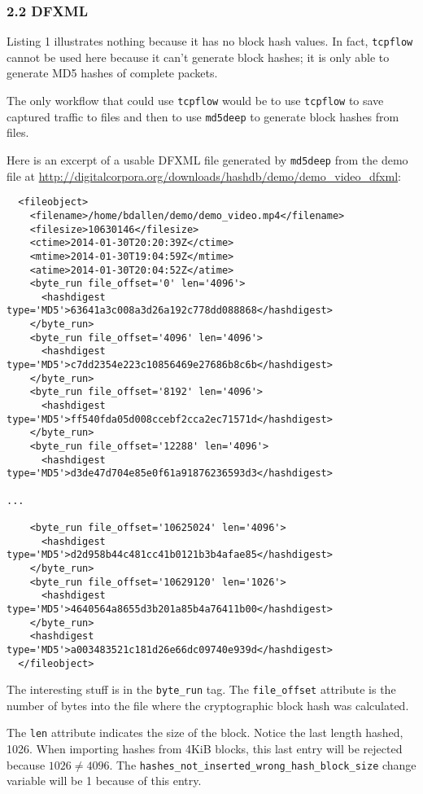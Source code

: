 \documentclass[12pt,twoside]{article}
\begin{document}
\subsubsection*{2.2 DFXML}
Listing 1 illustrates nothing because it has no block hash values.
In fact, \texttt{tcpflow} cannot be used here
because it can't generate block hashes; it is only able to 
generate MD5 hashes of complete packets.

The only workflow that could use \texttt{tcpflow}
would be to use \texttt{tcpflow} to save captured traffic
to files and then to use \texttt{md5deep}
to generate block hashes from files.

Here is an excerpt of a usable DFXML file generated by \texttt{md5deep}
from the demo file at
\url{http://digitalcorpora.org/downloads/hashdb/demo/demo\_video\_dfxml}:

\begin{verbatim}
  <fileobject>
    <filename>/home/bdallen/demo/demo_video.mp4</filename>
    <filesize>10630146</filesize>
    <ctime>2014-01-30T20:20:39Z</ctime>
    <mtime>2014-01-30T19:04:59Z</mtime>
    <atime>2014-01-30T20:04:52Z</atime>
    <byte_run file_offset='0' len='4096'>   
      <hashdigest type='MD5'>63641a3c008a3d26a192c778dd088868</hashdigest>
    </byte_run>
    <byte_run file_offset='4096' len='4096'>   
      <hashdigest type='MD5'>c7dd2354e223c10856469e27686b8c6b</hashdigest>
    </byte_run>
    <byte_run file_offset='8192' len='4096'>   
      <hashdigest type='MD5'>ff540fda05d008ccebf2cca2ec71571d</hashdigest>
    </byte_run>
    <byte_run file_offset='12288' len='4096'>   
      <hashdigest type='MD5'>d3de47d704e85e0f61a91876236593d3</hashdigest>

...

    <byte_run file_offset='10625024' len='4096'>   
      <hashdigest type='MD5'>d2d958b44c481cc41b0121b3b4afae85</hashdigest>
    </byte_run>
    <byte_run file_offset='10629120' len='1026'>   
      <hashdigest type='MD5'>4640564a8655d3b201a85b4a76411b00</hashdigest>
    </byte_run>
    <hashdigest type='MD5'>a003483521c181d26e66dc09740e939d</hashdigest>
  </fileobject>
\end{verbatim}

The interesting stuff is in the \texttt{byte\_run} tag.
The \texttt{file\_offset} attribute is the number of bytes into the file
where the cryptographic block hash was calculated.

The \texttt{len} attribute indicates the size of the block.
Notice the last length hashed, 1026.
When importing hashes from 4KiB blocks, this last entry will be rejected
because $1026 \ne 4096$.
The \texttt{hashes\_not\_inserted\_wrong\_hash\_block\_size} change variable 
will be 1 because of this entry.
\end{document}

